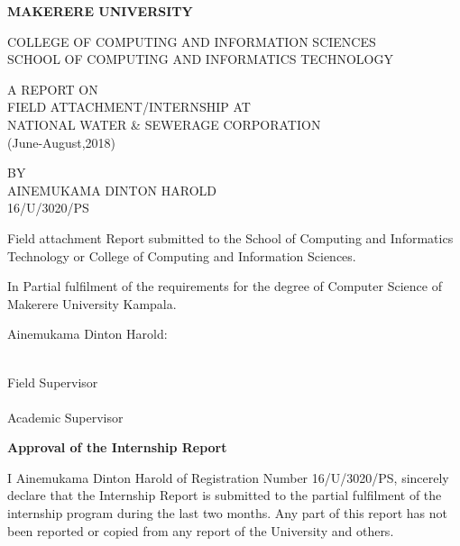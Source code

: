 \documentclass{article}
\begin{document}
\begin{titlepage}
\begin{center}
\textbf{MAKERERE UNIVERSITY}
\end{center}
COLLEGE OF COMPUTING AND INFORMATION SCIENCES\\
SCHOOL OF COMPUTING AND INFORMATICS TECHNOLOGY\\
\begin{center}
A REPORT ON\\FIELD ATTACHMENT/INTERNSHIP AT\\NATIONAL WATER \& SEWERAGE CORPORATION\\(June-August,2018)
\end{center}
\begin{center}
BY\\AINEMUKAMA DINTON HAROLD\\16/U/3020/PS
\end{center}
\hangindent 2cm Field attachment Report submitted to the School of Computing and Informatics Technology or College of Computing and Information Sciences.\\
\par In Partial fulfilment of the requirements for the degree of Computer Science of Makerere University Kampala.
\begin{center}
Ainemukama Dinton Harold:\dotfill
\end{center}
\makebox[2.5in]{\hrulefill} \hspace{0.3in}\makebox[2.5in]{\dotfill}\\
Field Supervisor \hspace{1.5in} \\
\vspace{.1in}
\makebox[2.5in]{\hrulefill} \hspace{0.3in}\makebox[2.5in]{\dotfill}\\
Academic Supervisor  \hspace{1.5in} \\
\end{titlepage}
\thispagestyle{empty}
\newpage
\textbf{Approval of the Internship Report}
\par I Ainemukama Dinton Harold of Registration Number 16/U/3020/PS, sincerely declare that the Internship Report is submitted to the partial fulfilment of the internship program during the last two months. Any part of this report has not been reported or copied from any report of the University and others.\\
\end{document}
